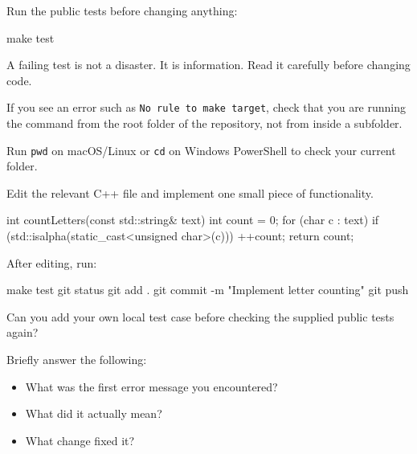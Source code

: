 \documentclass{csc2059practical}
\begin{document}

Run the public tests before changing anything:

\begin{bashcode}
make test
\end{bashcode}

A failing test is not a disaster. It is information. Read it carefully before changing code.

\begin{commonerror}
If you see an error such as \texttt{No rule to make target}, check that you are running the command from the root folder of the repository, not from inside a subfolder.
\end{commonerror}

\begin{tipbox}
Run \texttt{pwd} on macOS/Linux or \texttt{cd} on Windows PowerShell to check your current folder.
\end{tipbox}


Edit the relevant C++ file and implement one small piece of functionality.

\begin{cppcode}
int countLetters(const std::string& text) {
    int count = 0;
    for (char c : text) {
        if (std::isalpha(static_cast<unsigned char>(c))) {
            ++count;
        }
    }
    return count;
}
\end{cppcode}

After editing, run:

\begin{bashcode}
make test
git status
git add .
git commit -m "Implement letter counting"
git push
\end{bashcode}

\begin{challengebox}
Can you add your own local test case before checking the supplied public tests again?
\end{challengebox}

\begin{reflectionbox}
Briefly answer the following:
\begin{itemize}
  \item What was the first error message you encountered?
  \item What did it actually mean?
  \item What change fixed it?
\end{itemize}
\end{reflectionbox}
\end{document}
